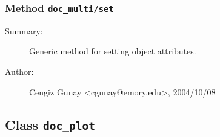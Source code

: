 \subsubsection[Method \texttt{set}]{Method \texttt{doc\_multi/set}}%
%
\label{ref_doc_multi__set}%
\hypertarget{ref_doc_multi__set}{}%
\begin{description}
\item[Summary:]Generic method for setting object attributes.
%
%
%
%
%
%
%
\item[Author:]%
Cengiz Gunay <cgunay@emory.edu>, 2004/10/08
%
\end{description}
\methodline%
\subsection{Class \texttt{doc\_plot}}%
%
\label{ref_doc_plot}%
\hypertarget{ref_doc_plot}{}%
